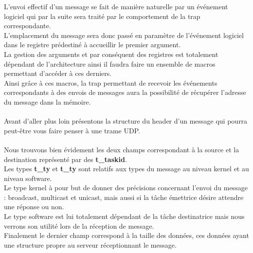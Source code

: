 \documentclass[10pt,a4wide]{article}
\begin{document}
L'envoi effectif d'un message se fait de mani\`ere naturelle par un \'ev\'enement logiciel qui par la suite sera trait\'e par
le comportement de la trap correspondante.\\
L'emplacement du message sera donc pass\'e en param\`etre de l'\'ev\'enement logiciel dans le registre pr\'edestin\'e \`a
accueillir le premier argument.\\
La gestion des arguments et par cons\'equent des registres est totalement d\'ependant de l'architecture ainsi il faudra faire
un ensemble de macros permettant d'acc\'eder \`a ces derniers.\\
Ainsi gr\^ace \`a ces macros, la trap permettant de recevoir les \'ev\'enements correspondants \`a des envois de messages aura
la possibilit\'e de r\'ecup\'erer l'adresse du message dans la m\'emoire.

\paragraph{}

Avant d'aller plus loin pr\'esentons la structure du header d'un message qui pourra peut-\^etre vous faire penser \`a une trame UDP.

\paragraph{}


\paragraph{}

Nous trouvons bien \'evidement les deux champs correspondant \`a la source et la destination repr\'esent\'e par des \textbf{t\_taskid}.\\
Les types \textbf{t\_ty} et \textbf{t\_ty} sont relatifs aux types du message au niveau kernel et au niveau software.\\
Le type kernel \`a pour but de donner des pr\'ecisions concernant l'envoi du message : broadcast, multicast et unicast, mais
aussi si la t\^ache \'emettrice d\'esire attendre une r\'eponse ou non.\\
Le type software est lui totalement d\'ependant de la t\^ache destinatrice mais nous verrons son utilit\'e lors de la r\'eception de
message.\\
Finalement le dernier champ correspond \`a la taille des donn\'ees, ces donn\'ees ayant une structure propre au serveur r\'eceptionnant
le message.
\end{document}
